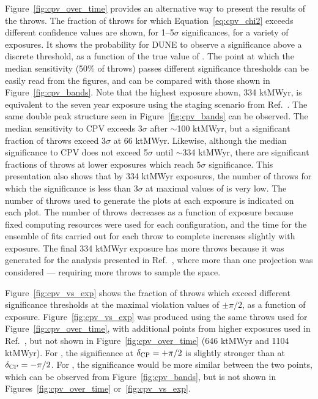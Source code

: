 Figure~\ref{fig:cpv_over_time} provides an alternative way to present the results of the throws. The fraction of throws for which Equation~\ref{eq:cpv_chi2} exceeds different confidence values are shown, for 1--5$\sigma$ significances, for a variety of exposures. It shows the probability for DUNE to observe a significance above a discrete threshold, as a function of the true value of \deltacp. The point at which the median sensitivity (50\% of throws) passes different significance thresholds can be easily read from the figures, and can be compared with those shown in Figure~\ref{fig:cpv_bands}. Note that the highest exposure shown, 334 ktMWyr, is equivalent to the seven year exposure using the staging scenario from Ref.~\cite{Abi:2020qib}. The same double peak structure seen in Figure~\ref{fig:cpv_bands} can be observed. The median sensitivity to CPV exceeds 3$\sigma$ after $\sim$100 ktMWyr, but a significant fraction of throws exceed 3$\sigma$ at 66 ktMWyr. Likewise, although the median significance to CPV does not exceed 5$\sigma$ until $\sim$334 ktMWyr, there are significant fractions of throws at lower exposures which reach $5\sigma$ significance. This presentation also shows that by 334 ktMWyr exposures, the number of throws for which the significance is less than 3$\sigma$ at maximal values of \deltacp is very low. The number of throws used to generate the plots at each exposure is indicated on each plot. The number of throws decreases as a function of exposure because fixed computing resources were used for each configuration, and the time for the ensemble of fits carried out for each throw to complete increases slightly with exposure. The final 334 ktMWyr exposure has more throws because it was generated for the analysis presented in Ref.~\cite{Abi:2020qib}, where more than one projection was considered --- requiring more throws to sample the space.

Figure~\ref{fig:cpv_vs_exp} shows the fraction of throws which exceed different significance thresholds at the maximal \deltacp violation values of $\pm\pi/2$, as a function of exposure. Figure~\ref{fig:cpv_vs_exp} was produced using the same throws used for Figure~\ref{fig:cpv_over_time}, with additional points from higher exposures used in Ref.~\cite{Abi:2020qib}, but not shown in Figure~\ref{fig:cpv_over_time} (646 ktMWyr and 1104 ktMWyr). For , the significance at $\delta_{\rm CP} = +\pi/2$ is slightly stronger than at $\delta_{\rm CP} = -\pi/2$. For , the significance would be more similar between the two points, which can be observed from Figure~\ref{fig:cpv_bands}, but is not shown in Figures~\ref{fig:cpv_over_time} or~\ref{fig:cpv_vs_exp}.

